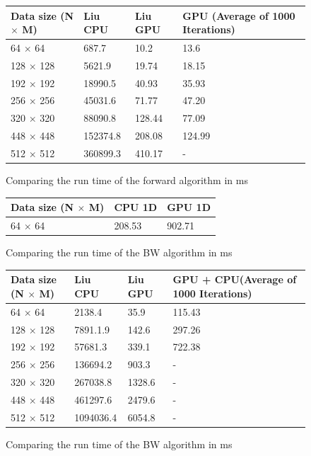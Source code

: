 \documentclass[english, paper=a4]{scrartcl}
\begin{document}
\begin{figure}[H]
\centering
\begin{tabular}{|l|l|l|l|}
\hline
Data size (N $\times$ M) & Liu CPU & Liu GPU & GPU (Average of 1000 Iterations)\\ \hline
64 $\times$ 64 & 687.7 & 10.2 & 13.6 \\ \hline
128 $\times$ 128 & 5621.9 & 19.74 & 18.15 \\ \hline
192 $\times$ 192 & 18990.5 & 40.93 & 35.93 \\ \hline
256 $\times$ 256 & 45031.6 & 71.77 & 47.20 \\ \hline
320 $\times$ 320 & 88090.8 & 128.44 & 77.09 \\ \hline
448 $\times$ 448 & 152374.8 & 208.08 & 124.99 \\ \hline
512 $\times$ 512 & 360899.3 & 410.17 & - \\ \hline

\end{tabular}

\caption{Comparing the run time of the forward algorithm in ms}
\end{figure}

\begin{figure}[H]
\centering
\begin{tabular}{|l|l|l|}
\hline
Data size (N $\times$ M) & CPU 1D & GPU 1D \\ \hline
64 $\times$ 64 & 208.53 & 902.71 \\ \hline

\end{tabular}

\caption{Comparing the run time of the BW algorithm in ms}
\end{figure}


\begin{figure}[H]
\centering
\begin{tabular}{|l|l|l|l|}
\hline
Data size (N $\times$ M) & Liu CPU & Liu GPU & GPU + CPU(Average of 1000 Iterations)\\ \hline
64 $\times$ 64 & 2138.4 & 35.9 & 115.43 \\ \hline
128 $\times$ 128 & 7891.1.9 & 142.6 & 297.26 \\ \hline
192 $\times$ 192 & 57681.3 & 339.1 & 722.38 \\ \hline
256 $\times$ 256 & 136694.2 & 903.3 & - \\ \hline
320 $\times$ 320 & 267038.8 & 1328.6 & - \\ \hline
448 $\times$ 448 & 461297.6 & 2479.6 & - \\ \hline
512 $\times$ 512 & 1094036.4 & 6054.8 & - \\ \hline

\end{tabular}

\caption{Comparing the run time of the BW algorithm in ms}
\end{figure}
\end{document}
